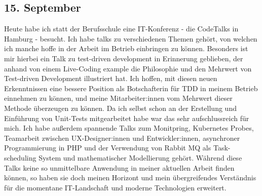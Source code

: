 \subsection{15. September}
Heute habe ich statt der Berufsschule eine IT-Konferenz - die CodeTalks in Hamburg - besucht. Ich habe talks zu verschiedenen Themen gehört, von welchen ich manche hoffe in der Arbeit im Betrieb einbringen zu können. Besonders ist mir hierbei ein Talk zu test-driven development in Erinnerung geblieben, der anhand von einem Live-Coding example die Philosophie und den Mehrwert von Test-driven Development illustriert hat. Ich hoffen, mit diesen neuen Erkenntnissen eine bessere Position als Botschafterin für TDD in meinem Betrieb einnehmen zu können, und meine Mitarbeiter:innen vom Mehrwert dieser Methode überzeugen zu können. Da ich selbst schon an der Erstellung und Einführung von Unit-Tests mitgearbeitet habe war das sehr aufschlussreich für mich. Ich habe außerdem spannende Talks zum Monitpring, Kubernetes Probes, Teamarbeit zwischen UX-Designer:innen und Entwickler:innen, asynchroner Programmierung in PHP und der Verwendung von Rabbit MQ als Task-scheduling System und mathematischer Modellierung gehört. Während diese Talks keine so unmittelbare Anwendung in meiner aktuellen Arbeit finden können, so haben sie doch meinen Horizont und mein übergreifendes Verständnis für die momentane IT-Landschaft und moderne Technologien erweitert.